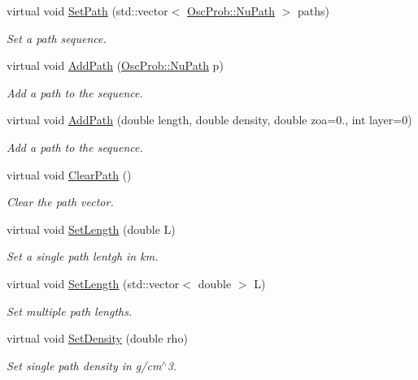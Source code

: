 \begin{DoxyCompactItemize}
virtual void \hyperlink{classOscProb_1_1PMNS__Base_a637d19dd850b4246507796526622643c}{Set\+Path} (std\+::vector$<$ \hyperlink{structOscProb_1_1NuPath}{Osc\+Prob\+::\+Nu\+Path} $>$ paths)
\begin{DoxyCompactList}\small\item\em Set a path sequence. \end{DoxyCompactList}\item 
virtual void \hyperlink{classOscProb_1_1PMNS__Base_a887dc9d4dc569ec0cdef3933b4c60efc}{Add\+Path} (\hyperlink{structOscProb_1_1NuPath}{Osc\+Prob\+::\+Nu\+Path} p)
\begin{DoxyCompactList}\small\item\em Add a path to the sequence. \end{DoxyCompactList}\item 
virtual void \hyperlink{classOscProb_1_1PMNS__Base_ab7f89ad9e7e1224adaa59d3c41594cd9}{Add\+Path} (double length, double density, double zoa=0., int layer=0)
\begin{DoxyCompactList}\small\item\em Add a path to the sequence. \end{DoxyCompactList}\item 
virtual void \hyperlink{classOscProb_1_1PMNS__Base_aefe521239031c418cfaaaa550a6e13bb}{Clear\+Path} ()
\begin{DoxyCompactList}\small\item\em Clear the path vector. \end{DoxyCompactList}\item 
virtual void \hyperlink{classOscProb_1_1PMNS__Base_a6241325b1bd28cafa556daaecbe4ed62}{Set\+Length} (double L)
\begin{DoxyCompactList}\small\item\em Set a single path lentgh in km. \end{DoxyCompactList}\item 
virtual void \hyperlink{classOscProb_1_1PMNS__Base_aa34a40a3b5abda0f252982d9ead3b520}{Set\+Length} (std\+::vector$<$ double $>$ L)
\begin{DoxyCompactList}\small\item\em Set multiple path lengths. \end{DoxyCompactList}\item 
virtual void \hyperlink{classOscProb_1_1PMNS__Base_ac74206f349687da141392c81e2ba6b0d}{Set\+Density} (double rho)
\begin{DoxyCompactList}\small\item\em Set single path density in g/cm$^\wedge$3. \end{DoxyCompactList}\item 

\end{DoxyCompactItemize}
